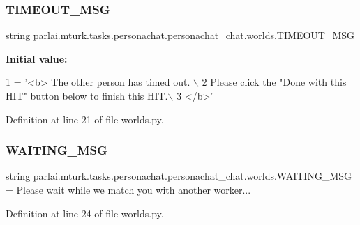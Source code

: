 \subsubsection{\texorpdfstring{T\+I\+M\+E\+O\+U\+T\+\_\+\+M\+SG}{TIMEOUT\_MSG}}
{\footnotesize\ttfamily string parlai.\+mturk.\+tasks.\+personachat.\+personachat\+\_\+chat.\+worlds.\+T\+I\+M\+E\+O\+U\+T\+\_\+\+M\+SG}

{\bfseries Initial value\+:}
\begin{DoxyCode}
1 =  \textcolor{stringliteral}{'<b> The other person has timed out. \(\backslash\)}
2 \textcolor{stringliteral}{        Please click the "Done with this HIT" button below to finish this HIT.\(\backslash\)}
3 \textcolor{stringliteral}{        </b>'}
\end{DoxyCode}


Definition at line 21 of file worlds.\+py.

\mbox{\label{namespaceparlai_1_1mturk_1_1tasks_1_1personachat_1_1personachat__chat_1_1worlds_a4ab0afffbdc84e52c9099fddbee3bf54}} 
\subsubsection{\texorpdfstring{W\+A\+I\+T\+I\+N\+G\+\_\+\+M\+SG}{WAITING\_MSG}}
{\footnotesize\ttfamily string parlai.\+mturk.\+tasks.\+personachat.\+personachat\+\_\+chat.\+worlds.\+W\+A\+I\+T\+I\+N\+G\+\_\+\+M\+SG = \textquotesingle{}Please wait while we match you with another worker...\textquotesingle{}}



Definition at line 24 of file worlds.\+py.

